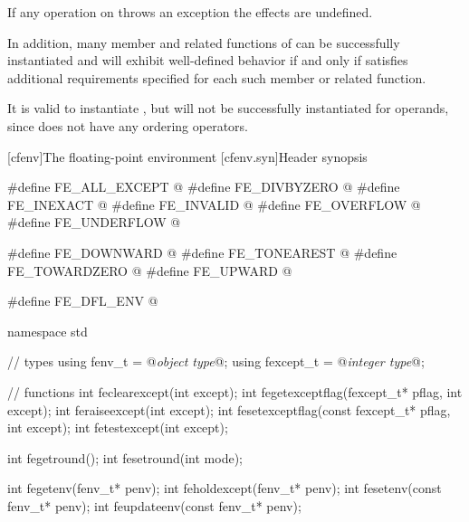\pnum
If any operation on 
throws an exception the effects are undefined.

\pnum
In addition, many member and related functions of
can be successfully instantiated
and will exhibit well-defined behavior if and only if
 satisfies additional requirements specified for each such member
or related function.

\pnum
\begin{example}
It is valid to instantiate
,
but
will not be successfully instantiated for
operands, since
does not have any ordering operators.
\end{example}

[cfenv]{The floating-point environment}
[cfenv.syn]{Header  synopsis}
%

%
%
%
%
%
%
%
%
%
%
%
%
%
%
%
%
%
%
%
%
%
%
%
%
\begin{codeblock}
#define FE_ALL_EXCEPT @\seebelow@
#define FE_DIVBYZERO @\seebelow@
#define FE_INEXACT @\seebelow@
#define FE_INVALID @\seebelow@
#define FE_OVERFLOW @\seebelow@
#define FE_UNDERFLOW @\seebelow@

#define FE_DOWNWARD @\seebelow@
#define FE_TONEAREST @\seebelow@
#define FE_TOWARDZERO @\seebelow@
#define FE_UPWARD @\seebelow@

#define FE_DFL_ENV @\seebelow@

namespace std {
  // types
  using fenv_t    = @\textit{object type}@;
  using fexcept_t = @\textit{integer type}@;

  // functions
  int feclearexcept(int except);
  int fegetexceptflag(fexcept_t* pflag, int except);
  int feraiseexcept(int except);
  int fesetexceptflag(const fexcept_t* pflag, int except);
  int fetestexcept(int except);

  int fegetround();
  int fesetround(int mode);

  int fegetenv(fenv_t* penv);
  int feholdexcept(fenv_t* penv);
  int fesetenv(const fenv_t* penv);
  int feupdateenv(const fenv_t* penv);
}
\end{codeblock}

